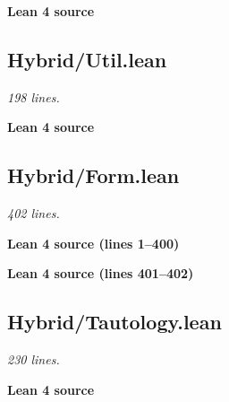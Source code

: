 \documentclass[11pt,a4paper]{article}
\renewcommand{\_}{\origtextunderscore\allowbreak}
\begin{document}
\vspace{0.5\baselineskip}
\noindent\textcolor{green!40!black}{\textbf{Lean 4 source}}\par\vspace{0.25\baselineskip}

\vspace{0.5\baselineskip}

\hypertarget{hybridutil.lean}{%
\subsection{Hybrid/Util.lean}\label{hybridutil.lean}}

\emph{198 lines.}

\vspace{0.5\baselineskip}
\noindent\textcolor{green!40!black}{\textbf{Lean 4 source}}\par\vspace{0.25\baselineskip}

\vspace{0.5\baselineskip}

\hypertarget{hybridform.lean}{%
\subsection{Hybrid/Form.lean}\label{hybridform.lean}}

\emph{402 lines.}

\noindent\textcolor{green!40!black}{\textbf{Lean 4 source (lines 1--400)}}\par\vspace{0.25\baselineskip}


\noindent\textcolor{green!40!black}{\textbf{Lean 4 source (lines 401--402)}}\par\vspace{0.25\baselineskip}


\hypertarget{hybridtautology.lean}{%
\subsection{Hybrid/Tautology.lean}\label{hybridtautology.lean}}

\emph{230 lines.}

\vspace{0.5\baselineskip}
\noindent\textcolor{green!40!black}{\textbf{Lean 4 source}}\par\vspace{0.25\baselineskip}

\vspace{0.5\baselineskip}
\end{document}
